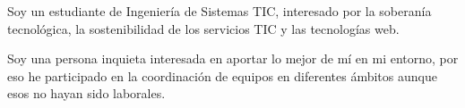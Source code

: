 \documentclass[9pt]{developercv} %
\begin{document}

\begin{minipage}[t]{0.4\textwidth} %
	\vspace{-\baselineskip} %
    Soy un estudiante de Ingeniería de Sistemas TIC, interesado por la soberanía tecnológica, la sostenibilidad de los servicios TIC y las tecnologías web.
    \vspace{\baselineskip}

    Soy una persona inquieta interesada en aportar lo mejor de mí en mi entorno, por eso he participado en la coordinación de equipos en diferentes ámbitos aunque esos no hayan sido laborales.
\end{minipage}
\hfill %
\begin{minipage}[t]{0.5\textwidth} %
	\vspace{-\baselineskip} %
	\begin{barchart}{5.5}
	\end{barchart}
\end{minipage}


\end{document}
